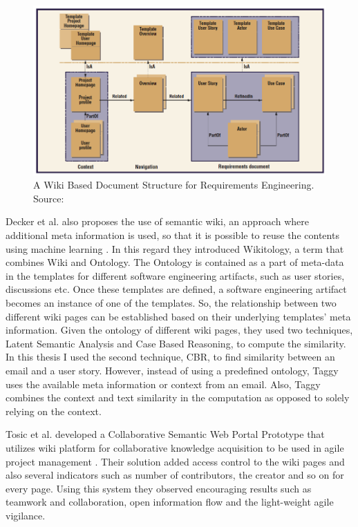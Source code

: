 \begin{figure}[bt]
	\centering
	\includegraphics[width=\textwidth]{Wiki.png}
    \caption{A Wiki Based Document Structure for Requirements Engineering. Source: \cite{wiki_based}}
	\label{fig:layman}
\end{figure}

Decker et al. also proposes the use of semantic wiki, an approach where additional meta information is used, so that it is possible to reuse the contents using machine learning \cite{self_organized}. In this regard they introduced Wikitology, a term that combines Wiki and Ontology. The Ontology is contained as a part of meta-data in the templates for different software engineering artifacts, such as user stories, discussions etc. Once these templates are defined, a software engineering artifact becomes an instance of one of the templates. So, the relationship between two different wiki pages can be established based on their underlying templates' meta information. Given the ontology of different wiki pages, they used two techniques, Latent Semantic Analysis and Case Based Reasoning, to compute the similarity. In this thesis I used the second technique, CBR, to find similarity between an email and a user story. However, instead of using a predefined ontology, Taggy uses the available meta information or context from an email. Also, Taggy combines the context and text similarity in the computation as opposed to solely relying on the context.

Tosic et al. developed a Collaborative Semantic Web Portal Prototype that utilizes wiki platform for collaborative knowledge acquisition to be used in agile project management \cite{collaborative_knowledge}. Their solution added access control to the wiki pages and also several indicators such as number of contributors, the creator and so on for every page. Using this system they observed encouraging results such as teamwork and collaboration, open information flow and the light-weight agile vigilance. 

